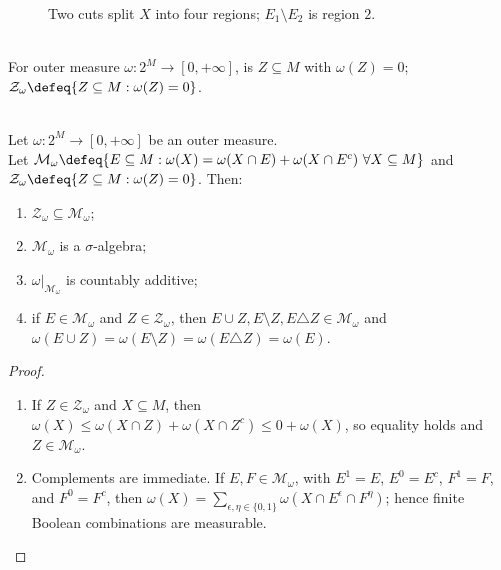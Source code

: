 \begin{figure}[H]
  \centering
  
  \caption{Two cuts split $X$ into four regions; $E_1\setminus E_2$ is region $2$.}
  \label{fig:measurable-difference-four-regions}
\end{figure}

\begin{definition} \label{def:outer-measure-zero-sets} \\
For outer measure $\omega:2^M\to[0,+\infty]$,  is $Z\subseteq M$ with $\omega(Z)=0$; $\mathcal{Z}_\omega\defeq\{Z\subseteq M:\omega(Z)=0\}$.
\end{definition}

\begin{theorem} \label{thm:caratheodory-measurable-sets-sigma-algebra} \\
Let $\omega:2^M\to[0,+\infty]$ be an outer measure.\\
Let $\mathcal{M}_\omega\defeq\{E\subseteq M:\omega(X)=\omega(X\cap E)+\omega(X\cap E^c)\ \forall X\subseteq M\}$ and $\mathcal{Z}_\omega\defeq\{Z\subseteq M:\omega(Z)=0\}$. Then:
\begin{enumerate}[label=(\roman*)]
\setlength{\itemsep}{0pt}
\item $\mathcal{Z}_\omega\subseteq\mathcal{M}_\omega$;
\item $\mathcal{M}_\omega$ is a $\sigma$-algebra;
\item $\omega|_{\mathcal{M}_\omega}$ is countably additive;
\item if $E\in\mathcal{M}_\omega$ and $Z\in\mathcal{Z}_\omega$, then $E\cup Z,E\setminus Z,E\triangle Z\in\mathcal{M}_\omega$ and $\omega(E\cup Z)=\omega(E\setminus Z)=\omega(E\triangle Z)=\omega(E)$.
\end{enumerate}
\begin{proof}
\begin{enumerate}[label=(\roman*)]
\setlength{\itemsep}{0pt}
\item If $Z\in\mathcal{Z}_\omega$ and $X\subseteq M$, then $\omega(X)\leq\omega(X\cap Z)+\omega(X\cap Z^c)\leq0+\omega(X)$, so equality holds and $Z\in\mathcal{M}_\omega$.
\item Complements are immediate. If $E,F\in\mathcal{M}_\omega$, with $E^1=E$, $E^0=E^c$, $F^1=F$, and $F^0=F^c$, then $\omega(X)=\sum_{\epsilon,\eta\in\{0,1\}}\omega(X\cap E^\epsilon\cap F^\eta)$; hence finite Boolean combinations are measurable.\\

\end{enumerate}
\end{proof}
\end{theorem}
